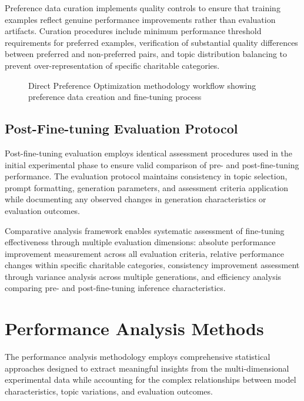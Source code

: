 Preference data curation implements quality controls to ensure that training examples reflect genuine performance improvements rather than evaluation artifacts. Curation procedures include minimum performance threshold requirements for preferred examples, verification of substantial quality differences between preferred and non-preferred pairs, and topic distribution balancing to prevent over-representation of specific charitable categories.

\begin{figure}[htbp]
    \centering
    \caption{Direct Preference Optimization methodology workflow showing preference data creation and fine-tuning process}
    \label{fig:dpo-methodology}
\end{figure}

\subsection{Post-Fine-tuning Evaluation Protocol}

Post-fine-tuning evaluation employs identical assessment procedures used in the initial experimental phase to ensure valid comparison of pre- and post-fine-tuning performance. The evaluation protocol maintains consistency in topic selection, prompt formatting, generation parameters, and assessment criteria application while documenting any observed changes in generation characteristics or evaluation outcomes.

Comparative analysis framework enables systematic assessment of fine-tuning effectiveness through multiple evaluation dimensions: absolute performance improvement measurement across all evaluation criteria, relative performance changes within specific charitable categories, consistency improvement assessment through variance analysis across multiple generations, and efficiency analysis comparing pre- and post-fine-tuning inference characteristics.

\section{Performance Analysis Methods}
\label{sec:performance-analysis}

The performance analysis methodology employs comprehensive statistical approaches designed to extract meaningful insights from the multi-dimensional experimental data while accounting for the complex relationships between model characteristics, topic variations, and evaluation outcomes.

